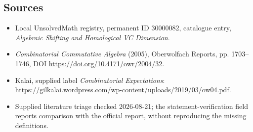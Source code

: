 \documentclass[11pt]{article}
\begin{document}
\subsection{Sources}
\begin{itemize}
\item Local UnsolvedMath registry, permanent ID 30000082, catalogue entry, \emph{Algebraic Shifting and Homological VC Dimension}.
\item \emph{Combinatorial Commutative Algebra} (2005), Oberwolfach Reports, pp. 1703--1746, DOI \url{https://doi.org/10.4171/owr/2004/32}.
\item Kalai, supplied label \emph{Combinatorial Expectations}: \url{https://gilkalai.wordpress.com/wp-content/uploads/2019/03/ow04.pdf}.
\item Supplied literature triage checked 2026-08-21; the statement-verification field reports comparison with the official report, without reproducing the missing definitions.
\end{itemize}
\end{document}
